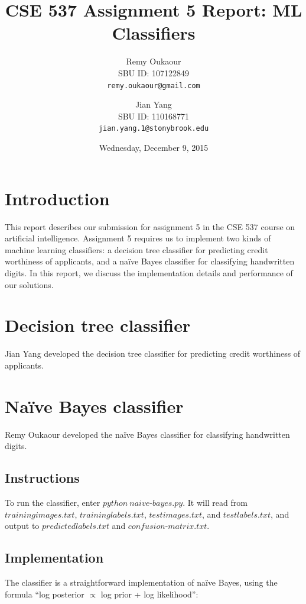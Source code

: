 \documentclass[11pt]{article}
\title{CSE 537 Assignment 5 Report: ML Classifiers}
\author{
Remy Oukaour \\
	{\small SBU ID: 107122849}\\
	{\small \texttt{remy.oukaour@gmail.com}}
\and
Jian Yang \\
	{\small SBU ID: 110168771}\\
	{\small \texttt{jian.yang.1@stonybrook.edu}}
}
\date{Wednesday, December 9, 2015}
\begin{document}
\maketitle

\section{Introduction}

This report describes our submission for assignment 5 in the CSE 537 course on
artificial intelligence. Assignment 5 requires us to implement two kinds of
machine learning classifiers: a decision tree classifier for predicting credit
worthiness of applicants, and a na{\"i}ve Bayes classifier for classifying
handwritten digits. In this report, we discuss the implementation details and
performance of our solutions.

\section{Decision tree classifier}

Jian Yang developed the decision tree classifier for predicting credit worthiness
of applicants.


\section{Na{\"i}ve Bayes classifier}

Remy Oukaour developed the na{\"i}ve Bayes classifier for classifying handwritten
digits.

\subsection{Instructions}

To run the classifier, enter $python\ naive\text{-}bayes.py$. It will read from
$trainingimages.txt$, $traininglabels.txt$, $testimages.txt$, and $testlabels.txt$,
and output to $predictedlabels.txt$ and $confusion\text{-}matrix.txt$.

\subsection{Implementation}

The classifier is a straightforward implementation of na{\"i}ve Bayes, using the formula
``log posterior $\propto$ log prior + log likelihood'':
\end{document}
